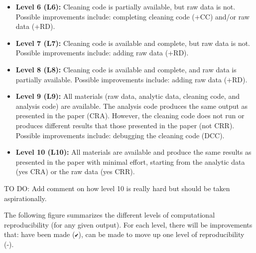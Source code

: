 \documentclass[]{book}
\begin{document}
\begin{itemize}
\item
  \textbf{Level 6 (L6):} Cleaning code is partially available, but raw data is not. Possible improvements include: completing cleaning code (+CC) and/or raw data (+RD).
\item
  \textbf{Level 7 (L7):} Cleaning code is available and complete, but raw data is not. Possible improvements include: adding raw data (+RD).
\item
  \textbf{Level 8 (L8):} Cleaning code is available and complete, and raw data is partially available. Possible improvements include: adding raw data (+RD).
\item
  \textbf{Level 9 (L9):} All materials (raw data, analytic data, cleaning code, and analysis code) are available. The analysis code produces the same output as presented in the paper (CRA). However, the cleaning code does not run or produces different results that those presented in the paper (not CRR). Possible improvements include: debugging the cleaning code (DCC).
\item
  \textbf{Level 10 (L10):} All materials are available and produce the same results as presented in the paper with minimal effort, starting from the analytic data (yes CRA) or the raw data (yes CRR).
\end{itemize}

TO DO: Add comment on how level 10 is really hard but should be taken aspirationally.

The following figure summarizes the different levels of computational reproducibility (for any given output). For each level, there will be improvements that: have been made (\texttt{✔}), can be made to move up one level of reproducibility (-).
\end{document}
